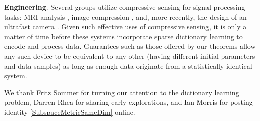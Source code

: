 \documentclass[journal, twocolumn]{IEEEtran}
\begin{document}

\textbf{Engineering}.
Several groups utilize compressive sensing for signal processing tasks: MRI analysis \cite{lustig2008compressed},  image compression \cite{Duarte08}, and, more recently, the design of an ultrafast camera \cite{Gao14}. Given such effective uses of compressive sensing, it is only a matter of time before these systems incorporate sparse dictionary learning to encode and process data. Guarantees such as those offered by our theorems allow any such device to be equivalent to any other (having different initial parameters and data samples) as long as enough data originate from a statistically identical system.


We thank Fritz Sommer for turning our attention to the dictionary learning problem, Darren Rhea for sharing early explorations, and Ian Morris for posting identity \eqref{SubspaceMetricSameDim} online.  







\end{document}
